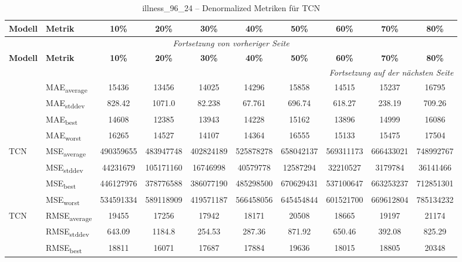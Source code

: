 {\small
\begin{longtable}{l l c c c c c c c c}
    \toprule
    \textbf{Modell} & \textbf{Metrik} & \textbf{10\%} & \textbf{20\%} & \textbf{30\%} & \textbf{40\%} & \textbf{50\%} & \textbf{60\%} & \textbf{70\%} & \textbf{80\%} \\
    \midrule
    \endfirsthead
    \multicolumn{10}{c}{\textit{Fortsetzung von vorheriger Seite}} \\
    \toprule
    \textbf{Modell} & \textbf{Metrik} & \textbf{10\%} & \textbf{20\%} & \textbf{30\%} & \textbf{40\%} & \textbf{50\%} & \textbf{60\%} & \textbf{70\%} & \textbf{80\%} \\
    \midrule
    \endhead
    \midrule
    \multicolumn{10}{r}{\textit{Fortsetzung auf der nächsten Seite}} \\
    \midrule
    \endfoot
    \bottomrule
    \caption{illness_96_24 -- Denormalized Metriken für TCN}
    \label{tab:illness_96_24_denormalized_tcn}
    \endlastfoot
\multirow{4}{*}{TCN} & MAE\textsubscript{average} & 15436 & 13456 & 14025 & 14296 & 15858 & 14515 & 15237 & 16795 \\
 & MAE\textsubscript{stddev} & 828.42 & 1071.0 & 82.238 & 67.761 & 696.74 & 618.27 & 238.19 & 709.26 \\
 & MAE\textsubscript{best} & 14608 & 12385 & 13943 & 14228 & 15162 & 13896 & 14999 & 16086 \\
 & MAE\textsubscript{worst} & 16265 & 14527 & 14107 & 14364 & 16555 & 15133 & 15475 & 17504 \\
\cmidrule(lr){2-10}
\multirow{4}{*}{TCN} & MSE\textsubscript{average} & 490359655 & 483947748 & 402824189 & 525878278 & 658042137 & 569311173 & 666433021 & 748992767 \\
 & MSE\textsubscript{stddev} & 44231679 & 105171160 & 16746998 & 40579778 & 12587294 & 32210527 & 3179784 & 36141466 \\
 & MSE\textsubscript{best} & 446127976 & 378776588 & 386077190 & 485298500 & 670629431 & 537100647 & 663253237 & 712851301 \\
 & MSE\textsubscript{worst} & 534591334 & 589118909 & 419571187 & 566458056 & 645454844 & 601521700 & 669612804 & 785134232 \\
\cmidrule(lr){2-10}
\multirow{4}{*}{TCN} & RMSE\textsubscript{average} & 19455 & 17256 & 17942 & 18171 & 20508 & 18665 & 19197 & 21174 \\
 & RMSE\textsubscript{stddev} & 643.09 & 1184.8 & 254.53 & 287.36 & 871.92 & 650.46 & 392.08 & 825.29 \\
 & RMSE\textsubscript{best} & 18811 & 16071 & 17687 & 17884 & 19636 & 18015 & 18805 & 20348 \\

\end{longtable}}

